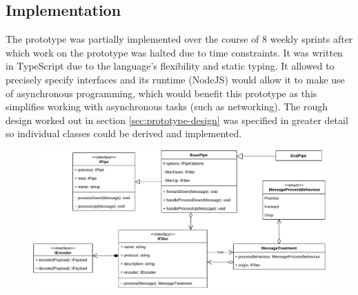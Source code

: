 \subsection{Implementation}
\label{sec:prototype-implementation}
The prototype was partially implemented over the course of 8 weekly sprints after which work on the prototype was halted due to time constraints. It was written in TypeScript due to the language's flexibility and static typing. It allowed to precisely specify interfaces and its runtime (NodeJS) would allow it to make use of asynchronous programming, which would benefit this prototype as this simplifies working with asynchronous tasks (such as networking). The rough design worked out in section \ref{sec:prototype-design} was specified in greater detail so individual classes could be derived and implemented.\par
\begin{figure}[h]
    \centering
    \includegraphics[width=14cm]{img/ch04/prototype/pipe-filter.pdf}
    \label{fig:prototype-pipe-filter}
\end{figure}
